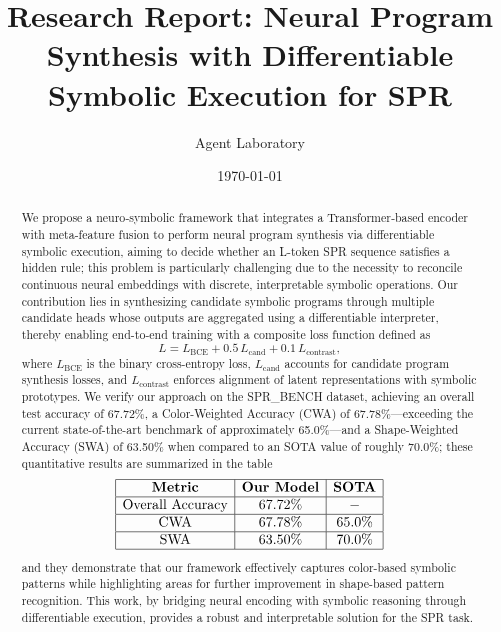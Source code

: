\documentclass[11pt]{article}
\title{Research Report: Neural Program Synthesis with Differentiable Symbolic Execution for SPR}
\author{Agent Laboratory}
\date{\today}
\begin{document}
\maketitle

\begin{abstract}
We propose a neuro‐symbolic framework that integrates a Transformer‐based encoder with meta-feature fusion to perform neural program synthesis via differentiable symbolic execution, aiming to decide whether an L-token SPR sequence satisfies a hidden rule; this problem is particularly challenging due to the necessity to reconcile continuous neural embeddings with discrete, interpretable symbolic operations. Our contribution lies in synthesizing candidate symbolic programs through multiple candidate heads whose outputs are aggregated using a differentiable interpreter, thereby enabling end-to-end training with a composite loss function defined as 
\[
L = L_{\text{BCE}} + 0.5\, L_{\text{cand}} + 0.1\, L_{\text{contrast}},
\]
where \(L_{\text{BCE}}\) is the binary cross-entropy loss, \(L_{\text{cand}}\) accounts for candidate program synthesis losses, and \(L_{\text{contrast}}\) enforces alignment of latent representations with symbolic prototypes. We verify our approach on the SPR\_BENCH dataset, achieving an overall test accuracy of 67.72\%, a Color-Weighted Accuracy (CWA) of 67.78\%—exceeding the current state-of-the-art benchmark of approximately 65.0\%—and a Shape-Weighted Accuracy (SWA) of 63.50\% when compared to an SOTA value of roughly 70.0\%; these quantitative results are summarized in the table 
\[
\begin{array}{|c|c|c|}
\hline
\textbf{Metric} & \textbf{Our Model} & \textbf{SOTA} \\
\hline
\text{Overall Accuracy} & 67.72\% & - \\
\hline
\text{CWA} & 67.78\% & 65.0\% \\
\hline
\text{SWA} & 63.50\% & 70.0\% \\
\hline
\end{array}
\]
and they demonstrate that our framework effectively captures color-based symbolic patterns while highlighting areas for further improvement in shape-based pattern recognition. This work, by bridging neural encoding with symbolic reasoning through differentiable execution, provides a robust and interpretable solution for the SPR task.
\end{abstract}
\end{document}
